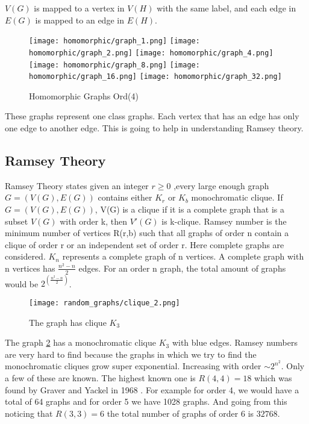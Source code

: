 \documentclass[15pt, a4paper]{Assignment}
\begin{document}
$V(G)$ is mapped to a vertex in $V(H)$ with the same label,
and each edge in $E(G)$ is mapped to an edge in $E(H)$. \cite{fan2010graph}
\begin{figure}[H]
	\texttt{[image: homomorphic/graph\_1.png]}
	\texttt{[image: homomorphic/graph\_2.png]}
	\texttt{[image: homomorphic/graph\_4.png]}
	\texttt{[image: homomorphic/graph\_8.png]}
	\texttt{[image: homomorphic/graph\_16.png]}
	\texttt{[image: homomorphic/graph\_32.png]}
	\caption{Homomorphic Graphs Ord(4)}
	\label{Homomorphic}
\end{figure}
These graphs represent one class graphs.
Each vertex that has an edge has only one edge to another edge.
This is going to help in understanding Ramsey theory.
\newline
\subsection*{Ramsey Theory}
Ramsey Theory states given an integer $ r\geq 0$ ,every large enough graph $G = (V(G),E(G))$ contains either  $K_r $ or ${K_b}$ monochromatic clique.\cite{katz2018introduction}
If $G = (V(G), E(G))$, V(G) is a clique if it is a complete graph that is a subset $V(G)$ with order k, then $V'(G)$ is k-clique.\cite{katz2018introduction} 
Ramsey number is the minimum number of vertices R(r,b) such that all graphs of order n contain a clique of order r or an independent set of order r.
Here complete graphs are considered.\cite{burr1981generalized}
$K_n$ represents a complete graph of n vertices.
A complete graph with n vertices has ${\frac{n^2-n}{2}}$ edges.
For an order n graph, the total amount of graphs would be $2^{\left(\frac{n^2-n}{2}\right)}$.
\begin{figure}[H]
	\centering
	\texttt{[image: random\_graphs/clique\_2.png]}
	\caption{The graph has clique $K_3$}
	\label{clique}
\end{figure}
The graph \ref{clique} has a monochromatic clique $K_3$ with blue edges.
Ramsey numbers are very hard to find because the graphs in which we try to find the monochromatic cliques grow super exponential.
Increasing with order $\sim 2^{n^2}$.
Only a few of these are known.
The highest known one is $R(4,4)= 18$ which was found by Graver and Yackel in 1968 \cite{GRAVER1968125}.
For example for order 4, we would have a total of 64 graphs and for order 5 we have 1028 graphs.
And going from this noticing that $R(3,3) = 6$ the total number of graphs of order 6 is $32768$.
\end{document}
